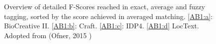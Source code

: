 \begin{figure}
\begin{minipage}{.5\linewidth}
  \centering
  \end{minipage}\par\medskip

  \caption[Overview of the highest F-Scores in exact, average and fuzzy tagging evaluation]{Overview of detailed F-Scores reached in exact, average and fuzzy tagging, sorted by the score achieved in averaged matching. \ref{AB1:a}: BioCreative II. \ref{AB1:b}: Craft. \ref{AB1:c}: IDP4. \ref{AB1:d} LocText. Adopted from (Ofner, 2015 \citep{ofner2015evaluation})}
\label{fig:AB1}
\end{figure}

